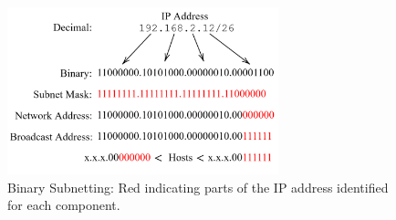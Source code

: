 \vspace{-1em}
\begin{figure}[h!]
    \hspace{2em}
    \includegraphics[width=0.7\textwidth]{Sections/network/ip_address.png}
    \caption{Binary Subnetting: Red indicating parts of the IP address identified for each component.}
    \label{fig:subnetting}
\end{figure}
\noindent
